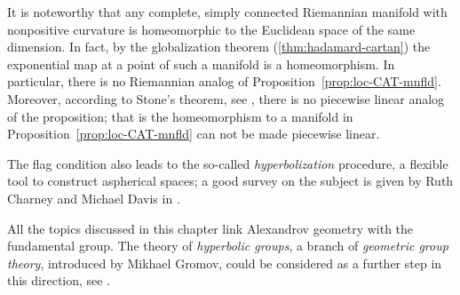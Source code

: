 It is noteworthy that any complete, simply connected Riemannian manifold with nonpositive curvature is homeomorphic to the Euclidean space of the same dimension.
In fact, by the globalization theorem
(\ref{thm:hadamard-cartan}) 
the exponential map at a point of such a manifold is a homeomorphism.
In particular, there is no Riemannian analog of Proposition~\ref{prop:loc-CAT-mnfld}.
Moreover, according to Stone's theorem, see \cite{stone, davis-januszkiewicz}, there is no piecewise linear analog of the proposition; 
that is the homeomorphism to a manifold in Proposition~\ref{prop:loc-CAT-mnfld} 
can not be made piecewise linear.

The flag condition also leads to the so-called {}\emph{hyperbolization} procedure, a flexible tool to construct  aspherical spaces;
a good survey on the subject is given by Ruth Charney and Michael Davis in \cite{charney-davis}.

All the topics discussed in this chapter link Alexandrov geometry with the fundamental group.
The theory of {}\emph{hyperbolic groups}, 
a branch of \emph{geometric group theory}, 
introduced by 
Mikhael Gromov,
could be considered as a further step in this direction, see \cite{gromov:hyp-groups}.




